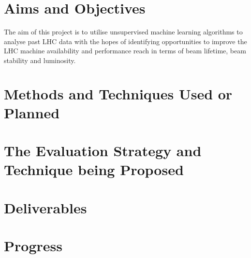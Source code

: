 \documentclass[12pt, twoside]{report}
\begin{document}
	
	\section{Aims and Objectives}
	\paragraph{ }The aim of this project is to utilise unsupervised machine learning algorithms to analyse past LHC data with the hopes of identifying opportunities to improve the LHC machine availability and performance reach in terms of beam lifetime, beam stability and luminosity.
	
	\section{Methods and Techniques Used or Planned}
	
	\section{The Evaluation Strategy and Technique being Proposed}
	
	\section{Deliverables}
	
	\section{Progress}
	
\end{document}

